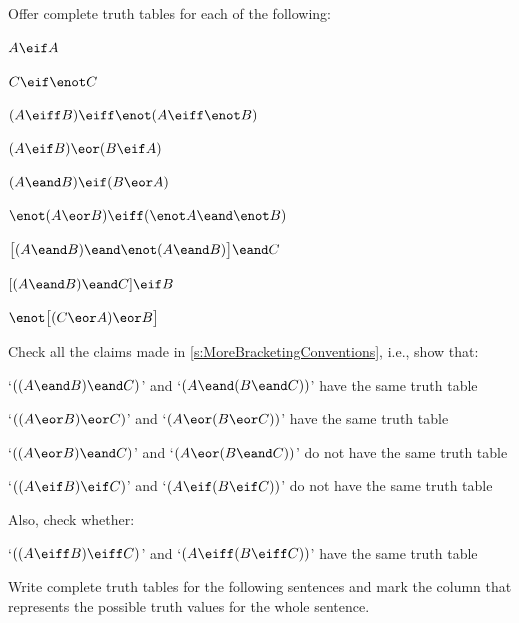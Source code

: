 \practiceproblems\label{pr.TT.TTorC}
\problempart
Offer complete truth tables for each of the following:
\begin{compactlist}
\item $A \eif A$ %
\item $C \eif\enot C$ %
\item $(A \eiff B) \eiff \enot(A\eiff \enot B)$ %
\item $(A \eif B) \eor (B \eif A)$ %
\item $(A \eand B) \eif (B \eor A)$  %
\item $\enot(A \eor B) \eiff (\enot A \eand \enot B)$ %
\item $\bigl[(A\eand B) \eand\enot(A\eand B)\bigr] \eand C$ %
\item $[(A \eand B) \eand C] \eif B$ %
\item $\enot\bigl[(C\eor A) \eor B\bigr]$ %
\end{compactlist}
\problempart
Check all the claims made in \cref{s:MoreBracketingConventions}, i.e., show that:
\begin{compactlist}
	\item `$((A \eand B) \eand C)$' and `$(A \eand (B \eand C))$' have the same truth table
	\item `$((A \eor B) \eor C)$' and `$(A \eor (B \eor C))$' have the same truth table
	\item `$((A \eor B) \eand C)$' and `$(A \eor (B \eand C))$' do not have the same truth table
	\item `$((A \eif B) \eif C)$' and `$(A \eif (B \eif C))$' do not have the same truth table
\end{compactlist}
Also, check whether:
\begin{compactlist}
	\item[5.] `$((A \eiff B) \eiff C)$' and `$(A \eiff (B \eiff C))$' have the same truth table
\end{compactlist}

\problempart
Write complete truth tables for the following sentences and mark the column that represents the possible truth values for the whole sentence.

